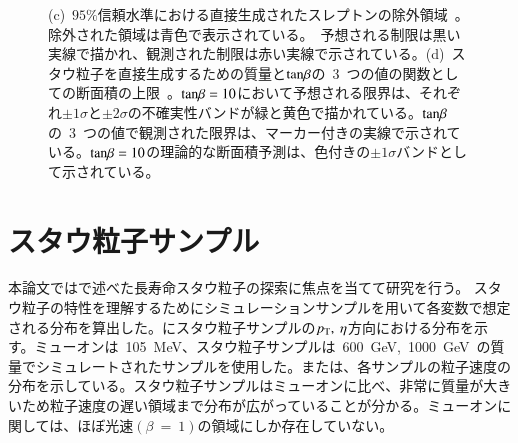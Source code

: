 \begin{figure}[tbp]
{    (c)~$95\%$信頼水準における直接生成されたスレプトンの除外領域~\cite{AR:03}。除外された領域は青色で表示されている。~予想される制限は黒い実線で描かれ、観測された制限は赤い実線で示されている。(d)~スタウ粒子を直接生成するための質量と$\rm{tan}\beta$の~3~つの値の関数としての断面積の上限~\cite{AR:03}。$\rm{tan}\beta=10$において予想される限界は、それぞれ$\pm1\sigma$と$\pm2\sigma$の不確実性バンドが緑と黄色で描かれている。$\rm{tan}\beta$の~3~つの値で観測された限界は、マーカー付きの実線で示されている。$\rm{tan}\beta=10$の理論的な断面積予測は、色付きの$\pm1\sigma$バンドとして示されている。}\label{fig:stau1}
\end{figure}

\section{スタウ粒子サンプル}
本論文ではで述べた長寿命スタウ粒子の探索に焦点を当てて研究を行う。
スタウ粒子の特性を理解するためにシミュレーションサンプルを用いて各変数で想定される分布を算出した。にスタウ粒子サンプルの$p_{\rm{T}},~\eta$方向における分布を示す。ミューオンは~105~MeV、スタウ粒子サンプルは~600~GeV,~1000~GeV~の質量でシミュレートされたサンプルを使用した。または、各サンプルの粒子速度の分布を示している。スタウ粒子サンプルはミューオンに比べ、非常に質量が大きいため粒子速度の遅い領域まで分布が広がっていることが分かる。ミューオンに関しては、ほぼ光速$\left(\beta~=~1\right)$の領域にしか存在していない。

